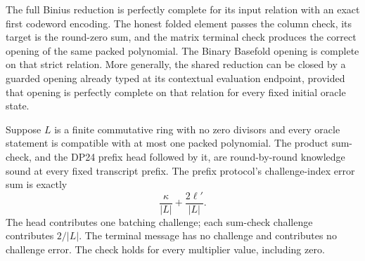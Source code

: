 \begin{theorem}
  \leanok
  \label{thm:ring_switching_completeness}
  The full Binius reduction is perfectly complete for its input relation with an exact first
  codeword encoding. The honest folded element passes the column check, its target is the
  round-zero sum, and the matrix terminal check produces the correct opening of the same packed
  polynomial. The Binary Basefold opening is complete on that strict relation. More generally,
  the shared reduction can be closed by a guarded opening already typed at its contextual
  evaluation endpoint, provided that opening is perfectly complete on that relation for every
  fixed initial oracle state.
\end{theorem}

\begin{theorem}
  \leanok
  \label{thm:ring_switching_core_soundness}
  Suppose $L$ is a finite commutative ring with no zero divisors and every oracle statement is
  compatible with at most one packed polynomial. The product sum-check, and the DP24 prefix
  head followed by it, are round-by-round knowledge sound at every fixed transcript prefix.
  The prefix protocol's challenge-index error sum is exactly
  \[
    \frac{\kappa}{\lvert L\rvert} + \frac{2\ell'}{\lvert L\rvert}.
  \]
  The head contributes one batching challenge; each sum-check challenge contributes
  $2/\lvert L\rvert$. The terminal message has no challenge and contributes no challenge error.
  The check holds for every multiplier value, including zero.
\end{theorem}

